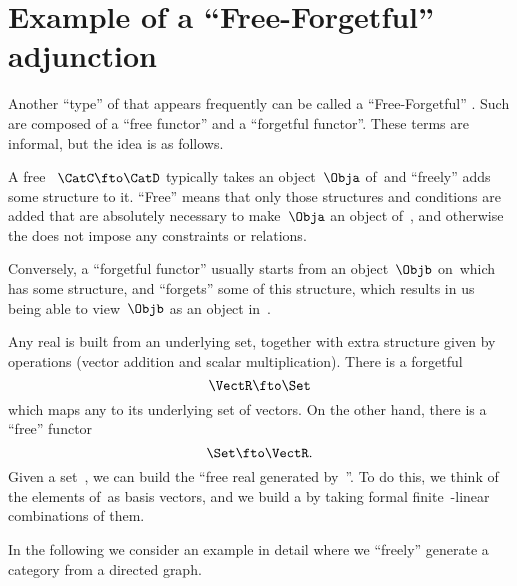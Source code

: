 
\section[Free-forgetful adjunction]{Example of a ``Free-Forgetful'' adjunction}
\label{sec:free-forgetful-adjunction-graph-example}

Another ``type'' of  that appears frequently can be called a ``Free-Forgetful'' .
Such  are composed of a ``free functor'' and a ``forgetful functor''.
These terms are informal, but the idea is as follows.

A free ~$\CatC \fto \CatD$ typically takes an object~$\Obja$ of~\CatC and ``freely'' adds some structure to it.
``Free'' means that only those structures and conditions are added that are absolutely necessary to make~$\Obja$ an object of~\CatD, and otherwise the  does not impose any constraints or relations.

Conversely, a ``forgetful functor'' usually starts from an object~$\Objb$ on~\CatD which has some structure, and ``forgets'' some of this structure, which results in us being able to view~$\Objb$ as an object in~\CatC.

\begin{example}
    Any real  is built from an underlying set, together with extra structure given by operations (vector addition and scalar multiplication).
    There is a forgetful 
    \begin{equation}\label{eq:forgetful-functor-from-VectR}
        \VectR \fto \Set
    \end{equation}
    which maps any  to its underlying set of vectors.
    On the other hand, there is a ``free'' functor
    \begin{equation}\label{eq:free-functor-to-VectR}
        \Set \fto \VectR.
    \end{equation}
    Given a set~\setA, we can build the ``free real  generated by~\setA''.
    To do this, we think of the elements of~\setA as basis vectors, and we build a  by taking formal finite~\reals-linear combinations of them.
\end{example}

In the following we consider an example in detail where we ``freely'' generate a category from a directed graph.

